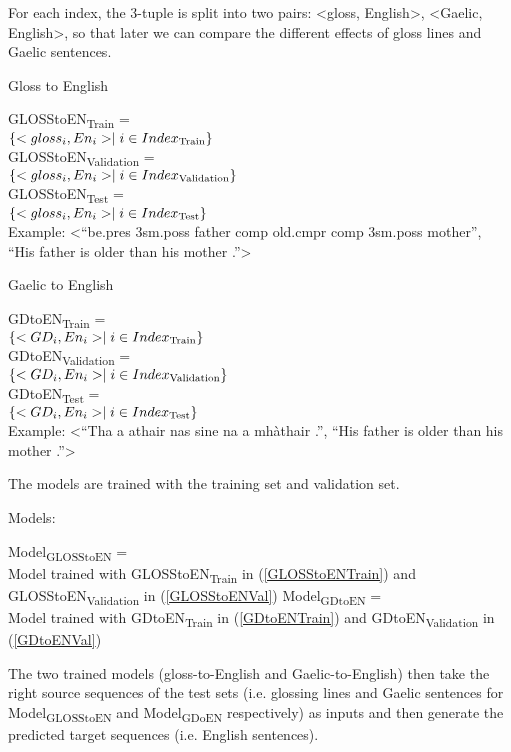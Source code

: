 \documentclass[a4paper]{article}
\begin{document}
For each index, the 3-tuple is split into two pairs: <gloss, English>, <Gaelic, English>, so that later we can compare the different effects of gloss lines and Gaelic sentences. 
\begin{exe}
	\ex Gloss to English
		\begin{xlist}
		\ex \label{GLOSStoENTrain} GLOSStoEN\textsubscript{Train}   =\\$\{<gloss_i,En_i>  \mid i \in Index\textsubscript{Train} \}$ \\
		\ex \label{GLOSStoENVal} GLOSStoEN\textsubscript{Validation}   = \\$\{<gloss_i,En_i>  \mid i \in Index\textsubscript{Validation} \}$ \\
		\ex \label{GLOSStoENTest}GLOSStoEN\textsubscript{Test} = \\$\{<gloss_i,En_i>  \mid i \in Index\textsubscript{Test} \}$ \\
		\ex  Example: <``be.pres 3sm.poss father comp old.cmpr comp 3sm.poss mother'', ``His father is older than his mother .''>
		\end{xlist}

	
	\ex Gaelic to English
		\begin{xlist}
		\ex \label{GDtoENTrain} GDtoEN\textsubscript{Train}   = \\$\{<GD_i,En_i>  \mid i \in Index\textsubscript{Train} \}$ \\
		\ex \label{GDtoENVal} GDtoEN\textsubscript{Validation}   =\\ $\{<GD_i,En_i>  \mid i \in Index\textsubscript{Validation} \}$ \\
		\ex \label{GDtoENTest} GDtoEN\textsubscript{Test}    = \\$\{<GD_i,En_i>  \mid i \in Index\textsubscript{Test} \}$ \\
		\ex Example: <``Tha a athair nas sine na a mh\`athair .'', ``His father is older than his mother .''>
		\end{xlist}
\end{exe}
The models are trained with the training set and validation set. 

\begin{exe}
\ex Models:
	\begin{xlist}
	\ex \label{ModelGlossToEN} Model\textsubscript{GLOSStoEN} =\\ Model trained with GLOSStoEN\textsubscript{Train} in (\ref{GLOSStoENTrain}) and GLOSStoEN\textsubscript{Validation} in (\ref{GLOSStoENVal})
	\ex \label{ModelGDToEN}Model\textsubscript{GDtoEN} =\\ Model trained with GDtoEN\textsubscript{Train} in (\ref{GDtoENTrain}) and GDtoEN\textsubscript{Validation} in (\ref{GDtoENVal})
	\end{xlist}	
\end{exe}
The two trained models (gloss-to-English and Gaelic-to-English) then take the right source sequences of the test sets (i.e. glossing lines and Gaelic sentences for Model\textsubscript{GLOSStoEN} and Model\textsubscript{GDoEN} respectively) as inputs and then generate the predicted target sequences (i.e. English sentences).
\end{document}
